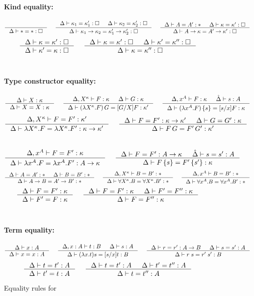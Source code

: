 \begin{figure}
\paragraph{Kind equality:}
\[ \inference{}{\Delta |- * = *:\square}
 ~~~~
   \inference{ \Delta |- \kappa_1 = \kappa_1' : \square
             & \Delta |- \kappa_2 = \kappa_2' : \square }
             {\Delta |- \kappa_1 -> \kappa_2 = \kappa_1' -> \kappa_2' : \square}
 ~~~~
   \inference{\Delta |- A=A':* & \Delta |- \kappa=\kappa':\square}
             {\Delta |- A -> \kappa = A' -> \kappa' : \square}
\]
\[ \inference{\Delta |- \kappa=\kappa':\square}
             {\Delta |- \kappa'=\kappa:\square}
 ~~~~
   \inference{ \Delta |- \kappa =\kappa' :\square
             & \Delta |- \kappa'=\kappa'':\square}
             {\Delta |- \kappa=\kappa'':\square}
\] ~\\

\paragraph{Type constructor equality:}
\[ \inference{\Delta |- X:\kappa }{\Delta |- X=X:\kappa}
 ~~~~
   \inference{\Delta,X^\kappa |- F:\kappa & \Delta |- G:\kappa}
             {\Delta |- (\lambda X^\kappa.F)\,G = [G/X]F:\kappa'}
 ~~~~
   \inference{\Delta,x^A |- F:\kappa & \hat\Delta |- s:A}
             {\Delta |- (\lambda x^A.F)\,\{s\} = [s/x]F:\kappa}
\]
\[ \inference{\Delta,X^\kappa |- F=F' : \kappa'}
             {\Delta |- \lambda X^\kappa.F=\lambda X^\kappa.F':\kappa-> \kappa'}
 ~~~~
   \inference{\Delta |- F=F':\kappa->\kappa' & \Delta |- G=G':\kappa}
             {\Delta |- F\,G = F'\,G' : \kappa'}
\]
 ~~~~
\[ \inference{\Delta,x^A |- F=F' : \kappa}
             {\Delta |- \lambda x^A.F=\lambda x^A.F' : A -> \kappa}
 ~~~~
   \inference{\Delta |- F=F':A->\kappa & \hat\Delta |- s=s':A}
             {\Delta |- F\,\{s\} = F'\,\{s'\} : \kappa}
\]
\[ \inference{\Delta |- A=A':* & \Delta |- B=B':*}{\Delta |- A-> B=A'-> B':*}
 ~~~~
   \inference{\Delta,X^\kappa |- B=B':*}
             {\Delta |- \forall X^\kappa.B=\forall X^\kappa.B':*}
 ~~~~
   \inference{\Delta,x^A |- B=B':*}
             {\Delta |- \forall x^A.B=\forall x^A.B':*}
\]
\[ \inference{\Delta |- F = F' : \kappa}{\Delta |- F' = F : \kappa}
 ~~~~
   \inference{\Delta |- F = F' : \kappa & \Delta |- F' = F'' : \kappa}
             {\Delta |- F = F'' : \kappa}
\] ~\\

\paragraph{Term equality:}
\[ \inference{\Delta |- x:A}{\Delta |- x=x:A}
 ~~~~
   \inference{\Delta,x:A |- t:B & \Delta |- s:A}
             {\Delta |- (\lambda x.t)s=[s/x]t : B}
 ~~~~
   \inference{\Delta |- r=r':A-> B & \Delta |- s=s':A}{\Delta |- r\;s=r'\;s':B}
\]
\[ \inference{\Delta |- t=t':A}{\Delta |- t'=t:A}
 ~~~~
   \inference{\Delta |- t=t':A & \Delta |- t'=t'':A}{\Delta |- t=t'':A}
\]

\caption{Equality rules for \Fi}
\label{fig:eqFi}
\end{figure}






